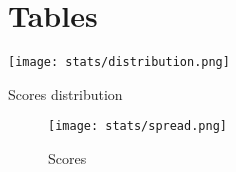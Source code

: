 \documentclass{tufte-book}
\begin{document}
\chapter{Tables}

\begin{marginfigure}
  \texttt{[image: stats/distribution.png]}
  \caption{Scores distribution}
\end{marginfigure}

\begin{figure*}[p]
  \texttt{[image: stats/spread.png]}
  \caption{Scores}
\end{figure*}

\begin{figure*}[p]
\hfill
{}
\\\vspace{\baselineskip}
\hfill
{}
\end{figure*}

\pagebreak
\end{document}
